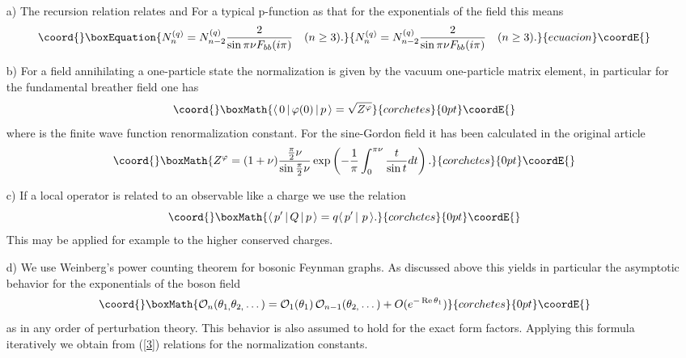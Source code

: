 \documentclass[a4paper,12pt]{article}
\def\func#1{\mathop{\rm #1}}%
\begin{document}
\begin{enumerate}
\item[a)]  The recursion relation \coordHE{} relates \coordHE{} and \coordHE{} For
a typical p-function as that for the exponentials of the field this means 
\begin{equation}\coord{}\boxEquation{
N_{n}^{(q)}=N_{n-2}^{(q)}\frac{2}{\sin \pi \nu F_{bb}(i\pi )}\quad (n\geq 3).
\label{N}
}{
N_{n}^{(q)}=N_{n-2}^{(q)}\frac{2}{\sin \pi \nu F_{bb}(i\pi )}\quad (n\geq 3).
}{ecuacion}\coordE{}\end{equation}

\item[b)]  For a field annihilating a one-particle state the normalization
is given by the vacuum one-particle matrix element, in particular for the
fundamental breather field one has 
\[\coord{}\boxMath{
\langle \,0\,|\,\varphi (0)\,|\,p\,\rangle =\sqrt{Z^{\varphi }} 
}{corchetes}{0pt}\coordE{}\]
where \coordHE{} is the finite wave function renormalization constant.
For the sine-Gordon field it has been calculated in the original article \cite
{KW} 
\[\coord{}\boxMath{
Z^{\varphi }=(1+\nu )\frac{\frac{\pi }{2}\nu }{\sin \frac{\pi }{2}\nu }\exp
\left( -\frac{1}{\pi }\int_{0}^{\pi \nu }\frac{t}{\sin t}dt\right) . 
}{corchetes}{0pt}\coordE{}\]

\item[c)]  If a local operator is related to an observable like a charge \coordHE{} we use the relation 
\[\coord{}\boxMath{
\langle \,p^{\prime }\,|\,Q\,|\,p\,\rangle =q\langle \,p^{\prime
}\,|\,\,p\,\rangle . 
}{corchetes}{0pt}\coordE{}\]
This may be applied for example to the higher conserved charges.

\item[d)]  We use Weinberg's power counting theorem for bosonic Feynman
graphs. As discussed above this yields in particular the asymptotic behavior
for the exponentials of the boson field \coordHE{} 
\[\coord{}\boxMath{
\mathcal{O}_{n}(\theta _{1,}\theta _{2,}\dots )=\mathcal{O}_{1}(\theta
_{1})\,\mathcal{O}_{n-1}(\theta _{2,}\dots )+O(e^{-\func{Re}\theta _{1}}) 
}{corchetes}{0pt}\coordE{}\]
as \myHighlight{$\func{Re}\theta _{1}\rightarrow \infty $}\coordHE{} in any order of perturbation
theory. This behavior is also assumed to hold for the exact form factors.
Applying this formula iteratively we obtain from (\ref{3}) relations for the
normalization constants.
\end{enumerate}
\end{document}
